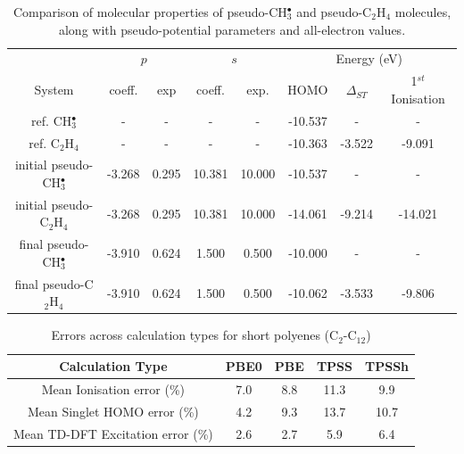\documentclass[12pt]{article}
\begin{document}
\begin{table}[h]
\caption{\label{table:potential_params} Comparison of molecular properties of pseudo-CH$^{\bullet}_{3}$ and pseudo-C$_{2}$H$_{4}$ molecules, along with pseudo-potential parameters and all-electron values.}
\begin{tabular}{c | c c c c | c c c}
\hline
 & \multicolumn{2}{c}{$p$} & \multicolumn{2}{c}{$s$} & \multicolumn{3}{|c}{Energy (eV)} \\
System & coeff. & exp & coeff. & exp. & HOMO & $\Delta_{ST}$ & 1$^{st}$ Ionisation \\
\hline
ref. CH$^{\bullet}_{3}$ & - & - & - & - & -10.537 & - & - \\
ref. C$_{2}$H$_{4}$ & - & - & - & - & -10.363 & -3.522 & -9.091 \\
\hline
initial pseudo-CH$^{\bullet}_{3}$ & -3.268 & 0.295 & 10.381 & 10.000 & -10.537 & - & - \\
initial pseudo-C$_{2}$H$_{4}$ & -3.268 & 0.295 & 10.381 & 10.000 & -14.061 & -9.214 & -14.021\\
\hline
final pseudo-CH$^{\bullet}_{3}$ & -3.910 & 0.624 & 1.500 & 0.500 & -10.000 & - & - \\
final pseudo-C$_{2}$H$_{4}$ & -3.910 & 0.624 & 1.500 & 0.500 & -10.062 & -3.533 & -9.806 \\
\hline
\end{tabular}
\end{table}


\newpage

\begin{table}[h]
\caption{Errors across calculation types for short polyenes (C\(_{2}\)-C\(_{12}\))}
\begin{tabular}{c c c c c }
\hline
Calculation Type & PBE0 & PBE & TPSS & TPSSh \\
\hline
Mean Ionisation  error (\%) & 7.0 & 8.8 & 11.3 & 9.9 \\
Mean Singlet HOMO  error (\%) & 4.2 & 9.3 & 13.7 & 10.7 \\
Mean TD-DFT Excitation error (\%) & 2.6 & 2.7 & 5.9 & 6.4 \\ 
\hline
\end{tabular}
\label{table:alkene_errors}
\end{table}
\end{document}
